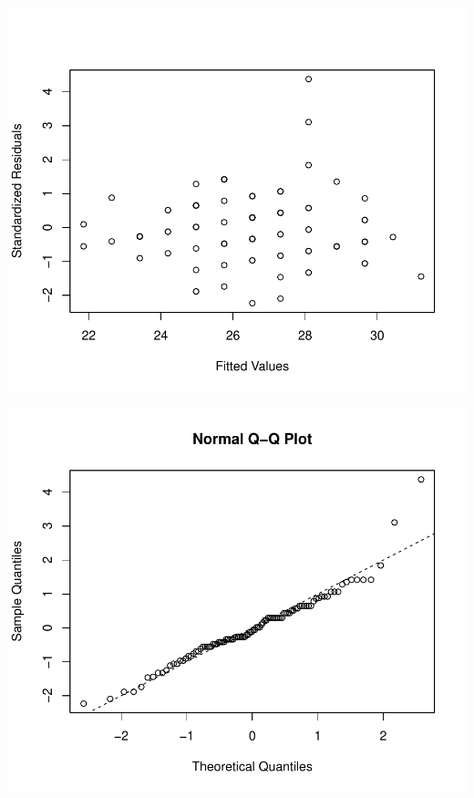 \documentclass{article}\usepackage[]{graphicx}\usepackage[svgnames]{xcolor}
\makeatletter
\def\maxwidth{ %
  \ifdim\Gin@nat@width>\linewidth
    \linewidth
  \else
    \Gin@nat@width
  \fi
}
\newenvironment{knitrout}{}{} %
\makeatother
\begin{document}
\begin{knitrout}
\color{fgcolor}

{\centering \includegraphics[width=\maxwidth]{figure/unnamed-chunk-14-1} 

}




{\centering \includegraphics[width=\maxwidth]{figure/unnamed-chunk-14-2} 

}


\end{knitrout}
\end{document}
